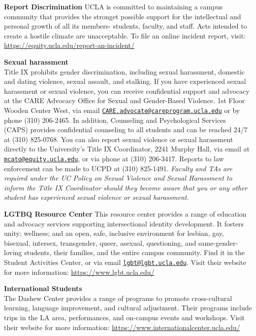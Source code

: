 \documentclass[11pt,]{article}
\begin{document}
\textbf{Report Discrimination} UCLA is committed to maintaining a campus
community that provides the stronget possible support for the
intellectual and personal growth of all its members- students, faculty,
and staff. Acts intended to create a hostile climate are unacceptable.
To file an online incident report, visit:
\url{https://equity.ucla.edu/report-an-incident/}

\textbf{Sexual harassment}\\
Title IX prohibits gender discrimination, including sexual harassment,
domestic and dating violence, sexual assault, and stalking. If you have
experienced sexual harassment or sexual violence, you can receive
confidential support and advocacy at the CARE Advocacy Office for Sexual
and Gender-Based Violence. 1st Floor Wooden Center West, via email
\href{mailto:CARE.advocate@careprogram.ucla.edu}{\nolinkurl{CARE.advocate@careprogram.ucla.edu}}
or by phone (310) 206-2465. In addition, Counseling and Psychological
Services (CAPS) provides confidential counseling to all students and can
be reached 24/7 at (310) 825-0768. You can also report sexual violence
or sexual harassment directly to the University's Title IX Coordinator,
2241 Murphy Hall, via email at
\href{mailto:mcato@equity.ucla.edu}{\nolinkurl{mcato@equity.ucla.edu}},
or via phone at (310) 206-3417. Reports to law enforcement can be made
to UCPD at (310) 825-1491. \emph{Faculty and TAs are required under the
UC Policy on Sexual Violence and Sexual Harassment to inform the Title
IX Coordinator should they become aware that you or any other student
has experienced sexual violence or sexual harassment.}

\textbf{LGTBQ Resource Center} This resource center provides a range of
education and advocacy services supporting intersectional identity
development. It fosters unity; wellness; and an open, safe, inclusive
environment for lesbian, gay, bisexual, intersex, transgender, queer,
asexual, questioning, and same-gender-loving students, their families,
and the entire campus community. Find it in the Student Activities
Center, or via email
\href{mailto:lgbt@lgbt.ucla.edu}{\nolinkurl{lgbt@lgbt.ucla.edu}}. Visit
their website for more information: \url{https://www.lgbt.ucla.edu/}

\textbf{International Students}\\
The Dashew Center provides a range of programs to promote cross-cultural
learning, language improvement, and cultural adjustment. Their programs
include trips in the LA area, performances, and on-campus events and
workshops. Visit their website for more information:
\url{https://www.internationalcenter.ucla.edu/}
\end{document}
